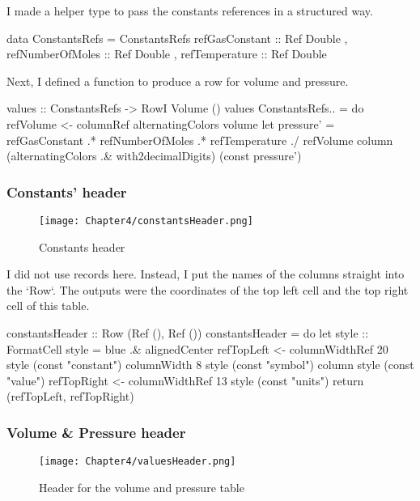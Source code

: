 I made a helper type to pass the constants references in a structured way.

\begin{mycode}
data ConstantsRefs = ConstantsRefs
  { refGasConstant :: Ref Double
  , refNumberOfMoles :: Ref Double
  , refTemperature :: Ref Double
  }
\end{mycode}

Next, I defined a function to produce a row for volume and pressure.

\begin{mycode}
values :: ConstantsRefs -> RowI Volume ()
values ConstantsRefs{..} = do
  refVolume <- columnRef alternatingColors volume
  let pressure' = refGasConstant .* refNumberOfMoles .* refTemperature ./ refVolume
  column (alternatingColors .& with2decimalDigits) (const pressure')
\end{mycode}

\subsubsection{Constants' header}

\begin{figure}[h]
  \centering
  \texttt{[image: Chapter4/constantsHeader.png]}
  \caption{Constants header}
  \label{fig:constantsHeader}
\end{figure}

I did not use records here. Instead, I put the names of the columns straight into the `Row`. The outputs were the coordinates of the top left cell and the top right cell of this table.

\begin{mycode}
constantsHeader :: Row (Ref (), Ref ())
constantsHeader = do
  let style :: FormatCell
      style = blue .& alignedCenter
  refTopLeft <- columnWidthRef 20 style (const "constant")
  columnWidth 8 style (const "symbol")
  column style (const "value")
  refTopRight <- columnWidthRef 13 style (const "units")
  return (refTopLeft, refTopRight)
\end{mycode}

\subsubsection{Volume \& Pressure header}

\begin{figure}[h]
  \centering
  \texttt{[image: Chapter4/valuesHeader.png]}
  \caption{Header for the volume and pressure table}
  \label{fig:valuesHeader}
\end{figure}

